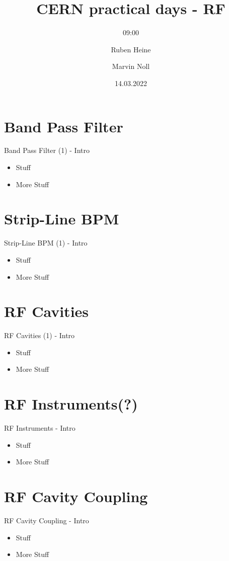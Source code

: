 \documentclass{beamer}
\title[Practical Days - RF]{CERN practical days - RF}
\subtitle{09:00}
\author[Heine, Noll]{Ruben Heine \and Marvin Noll}
\date[\today]{14.03.2022}
\begin{document}
\begin{frame}[plain]
  \titlepage
\end{frame}

\section{Band Pass Filter}
\begin{frame}[t,fragile]{Band Pass Filter (1) - Intro}
\begin{itemize}
\item Stuff
\item More Stuff
\end{itemize}
\end{frame}

\section{Strip-Line BPM}
\begin{frame}[t,fragile]{Strip-Line BPM (1) - Intro}
\begin{itemize}
\item Stuff
\item More Stuff
\end{itemize}
\end{frame}

\section{RF Cavities}
\begin{frame}[t,fragile]{RF Cavities (1) - Intro}
\begin{itemize}
\item Stuff
\item More Stuff
\end{itemize}
\end{frame}


\section{RF Instruments(?)}
\begin{frame}[t,fragile]{RF Instruments - Intro}
\begin{itemize}
\item Stuff
\item More Stuff
\end{itemize}
\end{frame}

\section{RF Cavity Coupling}
\begin{frame}[t,fragile]{RF Cavity Coupling - Intro}
\begin{itemize}
\item Stuff
\item More Stuff
\end{itemize}
\end{frame}
\end{document}
